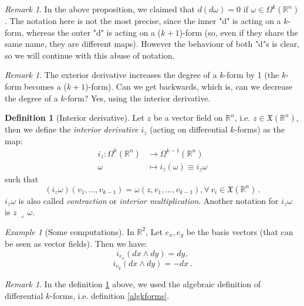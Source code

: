 \documentclass[a4paper,11pt,titlepage, article, oneside]{memoir}
\numberwithin{equation}{section}
\theoremstyle{definition}
\newtheorem{definition}[theorem]{Definition}
\theoremstyle{remark}
\newtheorem{remark}[theorem]{Remark}
\newtheorem{example}[theorem]{Example}
\newcommand{\rfield}{\mathbb{R}}
\begin{document}
\begin{remarkbox}\begin{remark} \label{abusenot1}
  In the above proposition, we claimed that $d(d\omega)  = 0$ if $\omega \in \Omega^k(\rfield^n)$. The notation here is not the most precise, since the inner "d" is acting on a $k$-form, whereas the outer "d" is acting on a ($k+1$)-form (so, even if they share the same name, they are different maps). However the behaviour of both "d"s is clear, so we will continue with this abuse of notation.
\end{remark}\end{remarkbox}

\begin{remarkbox}\begin{remark}
  The exterior derivative increases the degree of a $k$-form by 1 (the $k$-form becomes a ($k+1$)-form). Can we get backwards, which is, can we decrease the degree of a $k$-form? Yes, using the interior derivative.
\end{remark}\end{remarkbox}

\begin{definition}[Interior derivative] \label{intder}
  Let $z$ be a vector field on $\rfield^n$, i.e. $z \in \mathfrak{X}(\rfield^n)$, then we define the \textit{interior derivative} $i_z$ (acting on differential $k$-forms) as the map:
  \begin{align}
    i_z \colon \Omega^k(\rfield^n) &\rightarrow \Omega^{k-1}(\rfield^n) \\
    \omega &\mapsto i_z(\omega) \equiv i_z \omega \nonumber
  \end{align}
  such that
  $$(i_z \omega) (v_1, \ldots, v_{k-1}) = \omega(z, v_1, \ldots, v_{k-1}), \forall \, v_i \in \mathfrak{X}(\rfield^n) \, .$$
  $i_z \omega$ is also called  \textit{contraction} or \textit{interior multiplication}. Another notation for $i_z \omega$ is $z \, \lrcorner \, \omega$.
\end{definition}

\begin{tcolorbox}\begin{example}[Some computations]
  In $\rfield^2$, Let $e_x, e_y$ be the basis vectors (that can be seen as vector fields). Then we have:
  $$i_{e_x}(dx \wedge dy) = dy,$$
  $$i_{e_y}(dx \wedge dy) = - dx \, .$$
\end{example}\end{tcolorbox}

\begin{remarkbox}\begin{remark}
  In the definition \ref{intder} above, we used the algebraic definition of differential $k$-forms, i.e. definition \ref{algkforms}.
\end{remark}\end{remarkbox}
\end{document}
